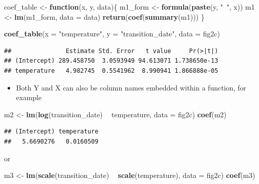 \documentclass[]{book}
\newenvironment{Shaded}{\begin{snugshade}}{\end{snugshade}}
\newcommand{\ControlFlowTok}[1]{\textcolor[rgb]{0.13,0.29,0.53}{\textbf{#1}}}
\newcommand{\DataTypeTok}[1]{\textcolor[rgb]{0.13,0.29,0.53}{#1}}
\newcommand{\KeywordTok}[1]{\textcolor[rgb]{0.13,0.29,0.53}{\textbf{#1}}}
\newcommand{\NormalTok}[1]{#1}
\newcommand{\OperatorTok}[1]{\textcolor[rgb]{0.81,0.36,0.00}{\textbf{#1}}}
\newcommand{\StringTok}[1]{\textcolor[rgb]{0.31,0.60,0.02}{#1}}
\providecommand{\tightlist}{%
  \setlength{\itemsep}{0pt}\setlength{\parskip}{0pt}}
\begin{document}
\begin{Shaded}
\begin{Highlighting}[]
\NormalTok{coef_table <-}\StringTok{ }\ControlFlowTok{function}\NormalTok{(x, y, data)\{}
\NormalTok{  m1_form <-}\StringTok{ }\KeywordTok{formula}\NormalTok{(}\KeywordTok{paste}\NormalTok{(y, }\StringTok{"~"}\NormalTok{, x))}
\NormalTok{  m1 <-}\StringTok{ }\KeywordTok{lm}\NormalTok{(m1_form, }\DataTypeTok{data =}\NormalTok{ data)}
  \KeywordTok{return}\NormalTok{(}\KeywordTok{coef}\NormalTok{(}\KeywordTok{summary}\NormalTok{(m1)))}
\NormalTok{\}}

\KeywordTok{coef_table}\NormalTok{(}\DataTypeTok{x =} \StringTok{"temperature"}\NormalTok{,}
           \DataTypeTok{y =} \StringTok{"transition_date"}\NormalTok{,}
           \DataTypeTok{data =}\NormalTok{ fig2c)}
\end{Highlighting}
\end{Shaded}

\begin{verbatim}
##               Estimate Std. Error   t value     Pr(>|t|)
## (Intercept) 289.458750  3.0593949 94.613071 1.738650e-13
## temperature   4.982745  0.5541962  8.990941 1.866888e-05
\end{verbatim}

\begin{itemize}
\tightlist
\item
  Both Y and X can also be column names embedded within a function, for example
\end{itemize}

\begin{Shaded}
\begin{Highlighting}[]
\NormalTok{m2 <-}\StringTok{ }\KeywordTok{lm}\NormalTok{(}\KeywordTok{log}\NormalTok{(transition_date) }\OperatorTok{~}\StringTok{ }\NormalTok{temperature, }\DataTypeTok{data =}\NormalTok{ fig2c)}
\KeywordTok{coef}\NormalTok{(m2)}
\end{Highlighting}
\end{Shaded}

\begin{verbatim}
## (Intercept) temperature 
##   5.6690276   0.0160509
\end{verbatim}

or

\begin{Shaded}
\begin{Highlighting}[]
\NormalTok{m3 <-}\StringTok{ }\KeywordTok{lm}\NormalTok{(}\KeywordTok{scale}\NormalTok{(transition_date) }\OperatorTok{~}\StringTok{ }\KeywordTok{scale}\NormalTok{(temperature), }\DataTypeTok{data =}\NormalTok{ fig2c)}
\KeywordTok{coef}\NormalTok{(m3)}
\end{Highlighting}
\end{Shaded}
\end{document}
